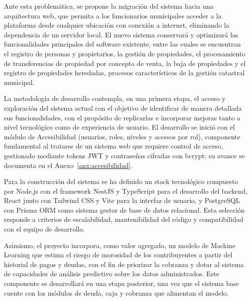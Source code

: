 \documentclass[12pt,a4paper]{report}
\begin{document}
Ante esta problemática, se propone la migración del sistema hacia una arquitectura web, que permita a los funcionarios municipales acceder a la plataforma desde cualquier ubicación con conexión a internet, eliminando la dependencia de un servidor local. El nuevo sistema conservará y optimizará las funcionalidades principales del software existente, entre las cuales se encuentran el registro de personas y propietarios, la gestión de propiedades, el procesamiento de transferencias de propiedad por concepto de venta, la baja de propiedades y el registro de propiedades heredadas, procesos característicos de la gestión catastral municipal.

La metodología de desarrollo contempla, en una primera etapa, el acceso y exploración del sistema actual con el objetivo de identificar de manera detallada sus funcionalidades, con el propósito de replicarlas e incorporar mejoras tanto a nivel tecnológico como de experiencia de usuario. El desarrollo se inició con el módulo de Accesibilidad (usuarios, roles, niveles y accesos por rol), componente fundamental al tratarse de un sistema web que requiere control de acceso, gestionado mediante tokens JWT y contraseñas cifradas con bcrypt; su avance se documenta en el Anexo~\ref{anx:accesibilidad}.

Para la construcción del sistema se ha definido un stack tecnológico compuesto por Node.js con el framework NestJS y TypeScript para el desarrollo del backend, React junto con Tailwind CSS y Vite para la interfaz de usuario, y PostgreSQL con Prisma ORM como sistema gestor de base de datos relacional. Esta selección responde a criterios de escalabilidad, mantenibilidad del código y compatibilidad con el equipo de desarrollo.

Asimismo, el proyecto incorpora, como valor agregado, un modelo de Machine Learning que estima el riesgo de morosidad de los contribuyentes a partir del historial de pagos y deudas, con el fin de priorizar la cobranza y dotar al sistema de capacidades de análisis predictivo sobre los datos administrados. Este componente se desarrollará en una etapa posterior, una vez que el sistema base cuente con los módulos de deuda, caja y cobranza que alimentan el modelo.

\clearpage

\renewcommand{\contentsname}{ÍNDICES}
\renewcommand{\listfigurename}{ÍNDICE DE FIGURAS}
\renewcommand{\listtablename}{ÍNDICE DE TABLAS}
\tableofcontents
\clearpage
\listoffigures
\clearpage
\listoftables
\clearpage
\end{document}
